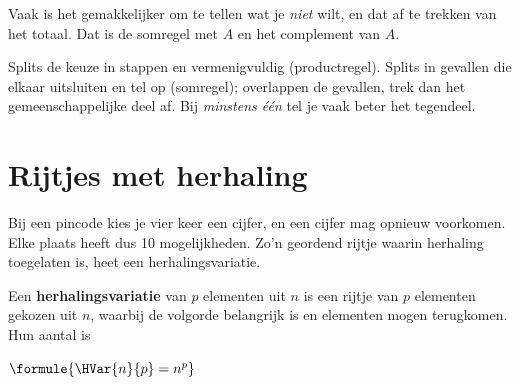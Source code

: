 \begin{oefeningen}
\end{oefeningen}

Vaak is het gemakkelijker om te tellen wat je \textit{niet} wilt, en dat af te trekken van het totaal. Dat is de somregel met $A$ en het complement van $A$.


\begin{werkwijze}
Splits de keuze in stappen en vermenigvuldig (productregel). Splits in gevallen die elkaar uitsluiten en tel op (somregel); overlappen de gevallen, trek dan het gemeenschappelijke deel af. Bij \textit{minstens één} tel je vaak beter het tegendeel.
\end{werkwijze}


\begin{oefeningen}


\end{oefeningen}

\section{Rijtjes met herhaling}

Bij een pincode kies je vier keer een cijfer, en een cijfer mag opnieuw voorkomen. Elke plaats heeft dus 10 mogelijkheden. Zo'n geordend rijtje waarin herhaling toegelaten is, heet een herhalingsvariatie.

\begin{theorie}
Een \textbf{\textcolor{accent}{herhalingsvariatie}} van $p$ elementen uit $n$ is een rijtje van $p$ elementen gekozen uit $n$, waarbij de volgorde belangrijk is en elementen mogen terugkomen. Hun aantal is

\vspace{1mm}
\qquad $\formule{\HVar{n}{p} = n^p}$
\end{theorie}

